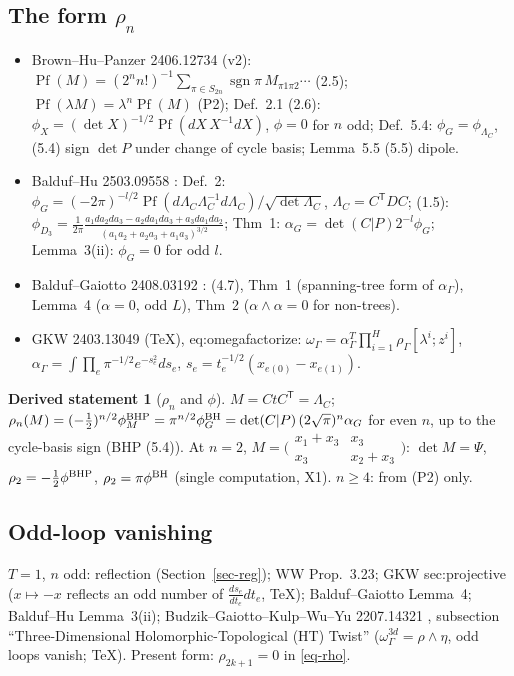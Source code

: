 \documentclass[10pt,a4paper]{article}
\numberwithin{equation}{section}
\theoremstyle{definition}
\newtheorem{dstatement}[theorem]{Derived statement}
\theoremstyle{remark}
\newcommand{\Pf}{\operatorname{Pf}}
\newcommand{\sgn}{\operatorname{sgn}}
\begin{document}
\subsection{\texorpdfstring{The form $\rho_n$}{The form rho\_n}}
\begin{itemize}\itemsep1pt
\item Brown--Hu--Panzer 2406.12734 \cite{BHP} (v2): $\Pf(M)=(2^nn!)^{-1}\sum_{\pi\in S_{2n}}\sgn\pi\,M_{\pi1\pi2}\cdots$ (2.5); $\Pf(\lambda M)=\lambda^n\Pf(M)$ (P2); Def.~2.1 (2.6): $\phi_X=(\det X)^{-1/2}\Pf(dX\,X^{-1}dX)$, $\phi=0$ for $n$ odd; Def.~5.4: $\phi_G=\phi_{\Lambda_C}$, (5.4) sign $\det P$ under change of cycle basis; Lemma~5.5 (5.5) dipole.
\item Balduf--Hu 2503.09558 \cite{BH}: Def.~2: $\phi_G=(-2\pi)^{-l/2}\Pf(d\Lambda_C\Lambda_C^{-1}d\Lambda_C)/\sqrt{\det\Lambda_C}$, $\Lambda_C=C^{\mathsf T}DC$; (1.5): $\phi_{D_3}=\frac1{2\pi}\frac{a_1da_2da_3-a_2da_1da_3+a_3da_1da_2}{(a_1a_2+a_2a_3+a_1a_3)^{3/2}}$; Thm~1: $\alpha_G=\det(C|P)2^{-l}\phi_G$; Lemma~3(ii): $\phi_G=0$ for odd $l$.
\item Balduf--Gaiotto 2408.03192 \cite{BG}: (4.7), Thm~1 (spanning-tree form of $\alpha_\Gamma$), Lemma~4 ($\alpha=0$, odd $L$), Thm~2 ($\alpha\wedge\alpha=0$ for non-trees).
\item GKW 2403.13049 \cite{GKW} (TeX), eq:omegafactorize: $\omega_\Gamma=\alpha_\Gamma^T\prod_{i=1}^H\rho_\Gamma[\lambda^i;z^i]$, $\alpha_\Gamma=\int\prod_e\pi^{-1/2}e^{-s_e^2}ds_e$, $s_e=t_e^{-1/2}(x_{e(0)}-x_{e(1)})$.
\end{itemize}
\begin{dstatement}[$\rho_n$ and $\phi$]
$M=CtC^{\mathsf T}=\Lambda_C$; $\rho_n(M)=(-\frac12)^{n/2}\phi^{\rm BHP}_M=\pi^{n/2}\phi^{\rm BH}_G=\det(C|P)\,(2\sqrt\pi)^n\alpha_G$ for even $n$, up to the cycle-basis sign (BHP (5.4)). At $n=2$, $M=\big(\begin{smallmatrix}x_1+x_3&x_3\\x_3&x_2+x_3\end{smallmatrix}\big)$: $\det M=\Psi$, $\rho_2=-\frac12\phi^{\rm BHP}$, $\rho_2=\pi\phi^{\rm BH}$ (single computation, X1). $n\ge4$: from (P2) only.
\end{dstatement}

\subsection{Odd-loop vanishing}
$T=1$, $n$ odd: reflection (Section~\ref{sec-reg}); WW Prop.~3.23; GKW sec:projective ($x\mapsto-x$ reflects an odd number of $\frac{ds_e}{dt_e}dt_e$, TeX); Balduf--Gaiotto Lemma~4; Balduf--Hu Lemma~3(ii); Budzik--Gaiotto--Kulp--Wu--Yu 2207.14321 \cite{Op}, subsection ``Three-Dimensional Holomorphic-Topological (HT) Twist'' ($\omega^{3d}_\Gamma=\rho\wedge\eta$, odd loops vanish; TeX). Present form: $\rho_{2k+1}=0$ in \eqref{eq-rho}.
\end{document}

